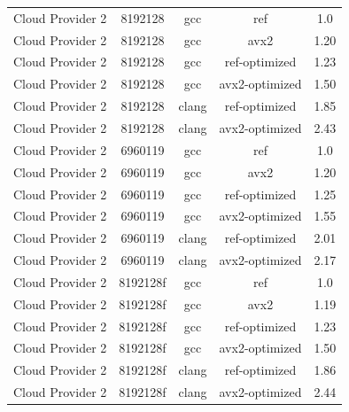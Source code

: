 \begin{table}
\begin{tabularx}{\linewidth}{X c c c c}
            Cloud Provider 2 &              8192128 &                  gcc &                  ref &                  1.0\\
            Cloud Provider 2 &              8192128 &                  gcc &                 avx2 &                1.20\\
            Cloud Provider 2 &              8192128 &                  gcc &        ref-optimized &                1.23\\
            Cloud Provider 2 &              8192128 &                  gcc &       avx2-optimized &                1.50\\
            Cloud Provider 2 &              8192128 &                clang &        ref-optimized &                1.85\\
            Cloud Provider 2 &              8192128 &                clang &       avx2-optimized &                2.43\\
            Cloud Provider 2 &              6960119 &                  gcc &                  ref &                  1.0\\
            Cloud Provider 2 &              6960119 &                  gcc &                 avx2 &                1.20\\
            Cloud Provider 2 &              6960119 &                  gcc &        ref-optimized &                1.25\\
            Cloud Provider 2 &              6960119 &                  gcc &       avx2-optimized &                1.55\\
            Cloud Provider 2 &              6960119 &                clang &        ref-optimized &                2.01\\
            Cloud Provider 2 &              6960119 &                clang &       avx2-optimized &                2.17\\
            Cloud Provider 2 &             8192128f &                  gcc &                  ref &                  1.0\\
            Cloud Provider 2 &             8192128f &                  gcc &                 avx2 &                1.19\\
            Cloud Provider 2 &             8192128f &                  gcc &        ref-optimized &                1.23\\
            Cloud Provider 2 &             8192128f &                  gcc &       avx2-optimized &                1.50\\
            Cloud Provider 2 &             8192128f &                clang &        ref-optimized &                1.86\\
            Cloud Provider 2 &             8192128f &                clang &       avx2-optimized &                2.44\\
        \bottomrule
    \end{tabularx}
\end{table}

